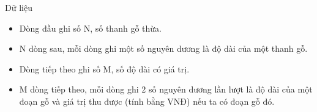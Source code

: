 Dữ liệu  
\begin{itemize}
	\item     Dòng đầu ghi số N, số thanh gỗ thừa.   
	\item     N dòng sau, mỗi dòng ghi một số nguyên dương là độ dài của một thanh gỗ.   
	\item     Dòng tiếp theo ghi số M, số độ dài có giá trị.   
	\item     M dòng tiếp theo, mỗi dòng ghi 2 số nguyên dương lần lượt là độ dài của một đoạn gỗ và giá trị thu được (tính bằng VNĐ) nếu ta có đoạn gỗ đó.   
\end{itemize}